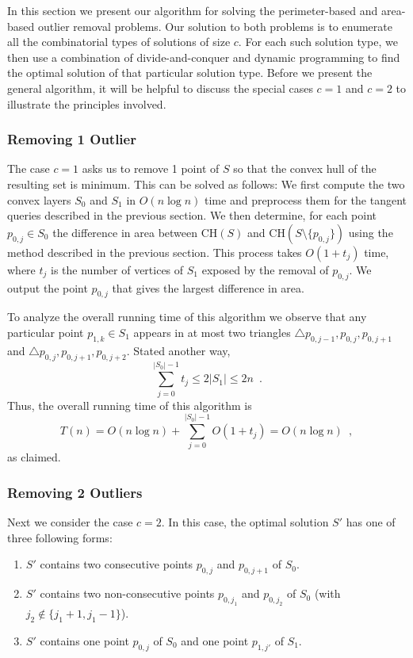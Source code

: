 \documentclass[lotsofwhite]{patmorin}
\newcommand{\ch}{\mathrm{CH}}
\begin{document}
In this section we present our algorithm for solving the
perimeter-based and area-based outlier removal problems. Our solution
to both problems is to enumerate all the combinatorial types of
solutions of size $c$.  For each such solution type, we then use a
combination of divide-and-conquer and dynamic programming to find the
optimal solution of that particular solution type.  Before we present
the general algorithm, it will be helpful to discuss the special cases
$c=1$ and $c=2$ to illustrate the principles involved.

\subsubsection{Removing 1 Outlier}

The case $c=1$ asks us to remove 1 point of $S$ so that the convex
hull of the resulting set is minimum.  This can be solved as follows:
We first compute the two convex layers $S_0$ and $S_1$ in $O(n\log n)$
time and preprocess them for the tangent queries described in the
previous section.  We then determine, for each point $p_{0,j}\in S_0$
the difference in area between $\ch(S)$ and
$\ch(S\setminus\{p_{0,j}\})$ using the method described in the
previous section.  This process takes $O(1+t_j)$ time, where $t_j$ is
the number of vertices of $S_1$ exposed by the removal of $p_{0,j}$.
We output the point $p_{0,j}$ that gives the largest difference in
area.

To analyze the overall running time of this algorithm we observe that
any particular point $p_{1,k}\in S_1$ appears in at most two triangles
$\triangle p_{0,j-1},p_{0,j},p_{0,j+1}$ and
$\triangle p_{0,j},p_{0,j+1},p_{0,j+2}$.  Stated another way,
\[
     \sum_{j=0}^{|S_0|-1} t_j \le 2|S_1|\le 2n \enspace .
\]
Thus, the overall running time of this algorithm is
\[
     T(n) = O(n\log n)+\sum_{j=0}^{|S_0|-1} O(1+t_j) = O(n\log n) \enspace ,
\]
as claimed.

\subsubsection{Removing 2 Outliers}

Next we consider the case $c=2$.  In this case, the optimal solution
$S'$ has one of three following forms:

\begin{enumerate}

\item $S'$ contains two consecutive points $p_{0,j}$ and $p_{0,j+1}$
of $S_0$.

\item $S'$ contains two non-consecutive points $p_{0,j_1}$ and
$p_{0,j_2}$ of $S_0$ (with $j_2\not\in\{j_1+1,j_1-1\}$).

\item $S'$ contains one point $p_{0,j}$ of $S_0$ and one point
$p_{1,j'}$ of $S_1$.

\end{enumerate}
\end{document}
